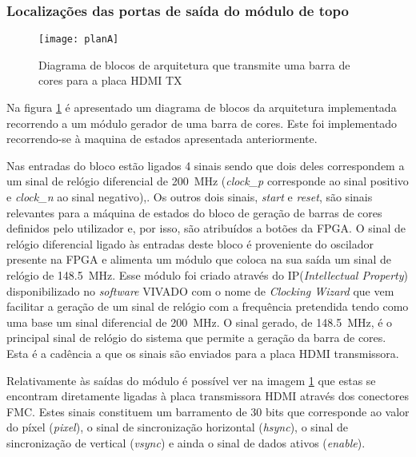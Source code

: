 \subsubsection*{Localizações das portas de saída do módulo de topo} 

\begin{figure}[h!]
	\begin{center}
		\leavevmode
		\texttt{[image: planA]}
		\caption{Diagrama de blocos de arquitetura que transmite uma barra de cores para a placa HDMI TX}
		\label{fig:planA}
	\end{center}
\end{figure}

Na figura \ref{fig:planA} é apresentado um diagrama de blocos da arquitetura implementada recorrendo a um módulo gerador de uma barra de cores. Este foi implementado recorrendo-se à maquina de estados apresentada anteriormente.

Nas entradas do bloco estão ligados 4 sinais sendo que dois deles correspondem a um sinal de relógio diferencial de \SI{200}{\mega\hertz} (\textit{clock\_p} corresponde ao sinal positivo e \textit{clock\_n} ao sinal negativo),. Os outros dois sinais, \textit{start} e \textit{reset}, são sinais relevantes para a máquina de estados do bloco de geração de barras de cores definidos pelo utilizador e, por isso, são atribuídos a botões da FPGA. O sinal de relógio diferencial ligado às entradas deste bloco é proveniente do oscilador presente na FPGA e alimenta um módulo que coloca na sua saída um sinal de relógio de \SI{148.5}{\mega\hertz}. Esse módulo foi criado através do IP(\textit{Intellectual Property}) disponibilizado no \textit{software} VIVADO com o nome de \textit{Clocking Wizard} que vem facilitar a geração de um sinal de relógio com a frequência pretendida tendo como uma base um sinal diferencial de \SI{200}{\mega\hertz}. O sinal gerado, de \SI{148.5}{\mega\hertz}, é o principal sinal de relógio do sistema que permite a geração da barra de cores. Esta é a cadência a que os sinais são enviados para a placa HDMI transmissora.

Relativamente às saídas do módulo é possível ver na imagem \ref{fig:planA} que estas se encontram diretamente ligadas à placa transmissora HDMI através dos conectores FMC. Estes sinais constituem um barramento de 30 bits que corresponde ao valor do píxel (\textit{pixel}), o sinal de sincronização horizontal (\textit{hsync}), o sinal de sincronização de vertical (\textit{vsync}) e ainda o sinal de dados ativos (\textit{enable}).

